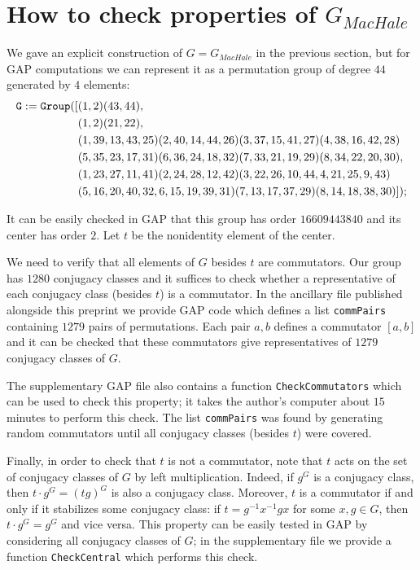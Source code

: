 \documentclass{article}
\begin{document}
\section{How to check properties of \( G_{MacHale} \)}

We gave an explicit construction of \( G = G_{MacHale} \) in the previous section, but for GAP computations we can
represent it as a permutation group of degree \( 44 \) generated by \( 4 \) elements:
\begin{align*}
	\tt G := Group([&(1,2)(43,44),\\
	&(1,2)(21,22),\\
	&(1,39,13,43,25)(2,40,14,44,26)(3,37,15,41,27)(4,38,16,42,28)\\
	&(5,35,23,17,31)(6,36,24,18,32)(7,33,21,19,29)(8,34,22,20,30),\\
	&(1,23,27,11,41)(2,24,28,12,42)(3,22, 26,10,44,4,21,25,9,43)\\
	&(5,16,20,40,32,6,15,19,39,31)(7,13,17,37,29)(8,14,18,38,30) ]);
\end{align*}

It can be easily checked in GAP that this group has order \( 16609443840 \) and its center has order \( 2 \).
Let \( t \) be the nonidentity element of the center.

We need to verify that all elements of \( G \) besides \( t \) are commutators.
Our group has \( 1280 \) conjugacy classes and it suffices to check whether a representative of each conjugacy class (besides \( t \))
is a commutator. In the ancillary file published alongside this preprint we provide GAP code which
defines a list \texttt{commPairs} containing \( 1279 \) pairs of permutations. Each pair \( a, b \) defines a commutator \( [a, b] \)
and it can be checked that these commutators give representatives of \( 1279 \) conjugacy classes of \( G \).

The supplementary GAP file also contains a function \texttt{CheckCommutators} which can be used to check this property; it takes the author's computer
about \( 15 \) minutes to perform this check.
The list \texttt{commPairs} was found by generating random commutators until all conjugacy classes (besides \( t \)) were covered.

Finally, in order to check that \( t \) is not a commutator, note that \( t \) acts on the set of conjugacy classes of \( G \) by left multiplication.
Indeed, if \( g^G \) is a conjugacy class, then \( t \cdot g^G = (tg)^G \) is also a conjugacy class. Moreover, \( t \) is a commutator if and only if
it stabilizes some conjugacy class: if \( t = g^{-1}x^{-1}gx \) for some \( x, g \in G \), then \( t \cdot g^G = g^G \) and vice versa.
This property can be easily tested in GAP by considering all conjugacy classes of \( G \); in the supplementary file we provide a function \texttt{CheckCentral}
which performs this check.
\end{document}
